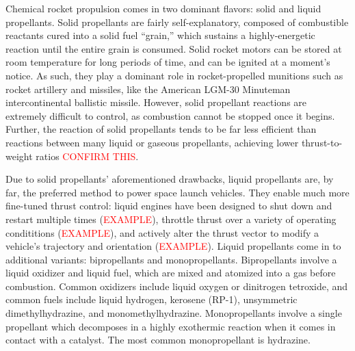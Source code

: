 Chemical rocket propulsion comes in two dominant flavors: solid and liquid propellants. Solid propellants are fairly self-explanatory, composed of combustible reactants cured into a solid fuel ``grain,'' which sustains a highly-energetic reaction until the entire grain is consumed. Solid rocket motors can be stored at room temperature for long periods of time, and can be ignited at a moment's notice. As such, they play a dominant role in rocket-propelled munitions such as rocket artillery and missiles, like the American LGM-30 Minuteman intercontinental ballistic missile. However, solid propellant reactions are extremely difficult to control, as combustion cannot be stopped once it begins. Further, the reaction of solid propellants tends to be far less efficient than reactions between many liquid or gaseous propellants, achieving lower thrust-to-weight ratios \textcolor{red}{CONFIRM THIS}.

Due to solid propellants' aforementioned drawbacks, liquid propellants are, by far, the preferred method to power space launch vehicles. They enable much more fine-tuned thrust control: liquid engines have been designed to shut down and restart multiple times (\textcolor{red}{EXAMPLE}), throttle thrust over a variety of operating condititions (\textcolor{red}{EXAMPLE}), and actively alter the thrust vector to modify a vehicle's trajectory and orientation (\textcolor{red}{EXAMPLE}). Liquid propellants come in to additional variants: bipropellants and monopropellants. Bipropellants involve a liquid oxidizer and liquid fuel, which are mixed and atomized into a gas before combustion. Common oxidizers include liquid oxygen or dinitrogen tetroxide, and common fuels include liquid hydrogen, kerosene (RP-1), unsymmetric dimethylhydrazine, and monomethylhydrazine. Monopropellants involve a single propellant which decomposes in a highly exothermic reaction when it comes in contact with a catalyst. The most common monopropellant is hydrazine.    

